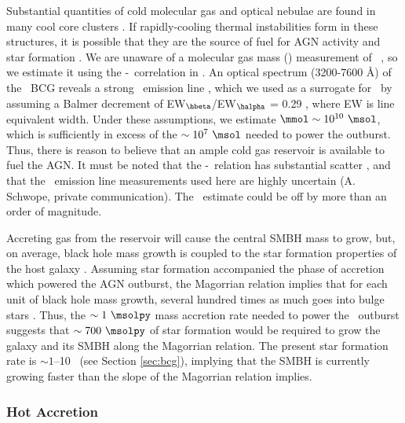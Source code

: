 \documentclass[11pt, preprint]{aastex}
\begin{document}
Substantial quantities of cold molecular gas and optical nebulae are
found in many cool core clusters \citep{crawford99, edge01}. If
rapidly-cooling thermal instabilities form in these structures, it is
possible that they are the source of fuel for AGN activity and star
formation \citep[\eg][]{pizzolato05, 2006NewA...12...38S,
  2010MNRAS.408..961P}. We are unaware of a molecular gas mass
(\mmol) measurement of \rbs\ , so we estimate it using the
\mmol-\halpha\ correlation in \citet{edge01}. An optical spectrum
(3200-7600 \AA) of the \rbs\ BCG reveals a strong \hbeta\ emission
line \citep{rbs1, rbs2}, which we used as a surrogate for \halpha\ by
assuming a Balmer decrement of EW$_{\hbeta}$/EW$_{\halpha}$ = 0.29
\citep{2006ApJ...642..775M}, where EW is line equivalent width. Under
these assumptions, we estimate $\mmol \sim 10^{10} ~\msol$, which is
sufficiently in excess of the $\sim 10^7 ~\msol$ needed to power the
outburst. Thus, there is reason to believe that an ample cold gas
reservoir is available to fuel the AGN. It must be noted that the
\mmol-\halpha\ relation has substantial scatter \citep{salome03}, and
that the \rbs\ emission line measurements used here are highly
uncertain (A. Schwope, private communication). The \mmol\ estimate
could be off by more than an order of magnitude.

Accreting gas from the reservoir will cause the central SMBH mass to
grow, but, on average, black hole mass growth is coupled to the star
formation properties of the host galaxy
\citep[\eg][]{1995ARA&A..33..581K, 2000ApJ...539L...9F}. Assuming star
formation accompanied the phase of accretion which powered the AGN
outburst, the Magorrian relation \citep{magorrian} implies that for
each unit of black hole mass growth, several hundred times as much
goes into bulge stars \citep[\eg][]{2004ApJ...604L..89H}. Thus, the
$\sim 1 ~\msolpy$ mass accretion rate needed to power the
\rbs\ outburst suggests that $\sim 700 ~\msolpy$ of star formation
would be required to grow the galaxy and its SMBH along the Magorrian
relation. The present star formation rate is $\sim 1$--10
\msolpy\ (see Section \ref{sec:bcg}), implying that the SMBH is
currently growing faster than the slope of the Magorrian relation
implies.

\subsubsection{Hot Accretion}
\end{document}

